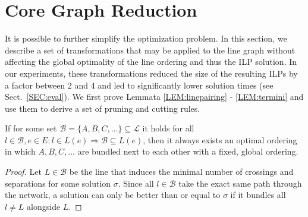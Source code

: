 \documentclass[format=acmsmall, review=false, screen=true]{acmart}
\begin{document}
\section{Core Graph Reduction}\label{SEC:coreprobgraph}
%
It is possible to further simplify the optimization problem. In this section, we describe a set of transformations that may be applied to the line graph without affecting the global optimality of the line ordering and thus the ILP solution. In our experiments, these transformations reduced the size of the resulting ILPs by a factor between 2 and 4 and led to significantly lower solution times (see Sect.~\ref{SEC:eval}). We first prove Lemmata \ref{LEM:linepairing} - \ref{LEM:termini} and use them to derive a set of pruning and cutting rules.
\begin{lemma}\label{LEM:linepairing}
If for some set $\mathcal{B} = \{A, B, C, ...\} \subseteq \mathcal{L}$ it holds for all $l \in \mathcal{B}, e \in E: l \in L(e) \Rightarrow \mathcal{B} \subseteq L(e)$, then it always exists an optimal ordering in which $A, B, C, ...$ are bundled next to each other with a fixed, global ordering.
\end{lemma}
\begin{proof}
Let $L \in \mathcal{B}$ be the line that induces the minimal number of crossings and separations for some solution $\sigma$. Since all $l \in \mathcal{B}$ take the exact same path through the network, a solution can only be better than or equal to $\sigma$ if it bundles all $l \neq L$ alongside $L$.
\end{proof}
\end{document}
